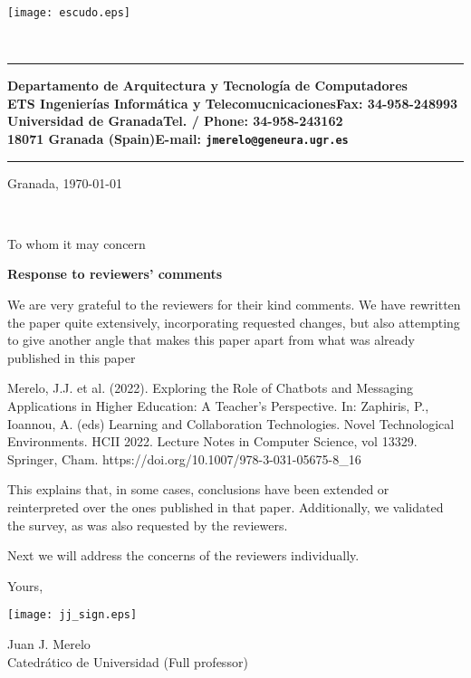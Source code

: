 \documentclass{letter}
\makeatletter
\def\email{\tt jmerelo@geneura.ugr.es}
\def\tel{34-958-243162}
\def\fax{34-958-248993}
\def\granada{18071 Granada (Spain)}
\def\ucm{Universidad de Granada}
\def\fac{ETS Ingenierías Informática y Telecomucnicaciones}
\def\dpto{Departamento de Arquitectura y Tecnolog\'ia de Computadores}
\def\cabecera{

\begin{minipage}{2.5cm}
\centerline{  \texttt{[image: escudo.eps]} }
\end{minipage}
\ \
\begin{minipage}{13cm}
 \rule{13cm}{0.6mm}
 \vspace*{0.3cm}
 {\small{\bf \dpto \hfill}} \\
 {\footnotesize{\bf \fac \hfill Fax: \fax}} \\
 {\footnotesize{\bf \ucm \hfill Tel. / Phone: \tel}} \\
 {\footnotesize{\bf \granada \hfill E-mail: \email}}\\
 \rule{13cm}{0.6mm}
\end{minipage}
}
\makeatother
\begin{document}
\cabecera

\vspace{0.5cm}

\hspace{7cm}

\hfill Granada, \today

\vspace{0.5cm}
\ \
{
\begin{minipage}[t]{9cm}
To whom it may concern
\end{minipage}
 }

\vspace{0.5cm}



{\bf Response to reviewers' comments}

We are very grateful to the reviewers for their kind comments. We have rewritten
the paper quite extensively, incorporating requested changes, but also
attempting to give another angle that makes this paper apart from what was
already published in this paper

Merelo, J.J. et al. (2022). Exploring the Role of Chatbots and Messaging
Applications in Higher Education: A Teacher’s Perspective. In: Zaphiris, P.,
Ioannou, A. (eds) Learning and Collaboration Technologies. Novel Technological
Environments. HCII 2022. Lecture Notes in Computer Science, vol 13329. Springer,
Cham. https://doi.org/10.1007/978-3-031-05675-8_16

This explains that, in some cases, conclusions have been extended or
reinterpreted over the ones published in that paper. Additionally, we validated
the survey, as was also requested by the reviewers.

Next we will address the concerns of the reviewers individually.


\hspace*{8cm} Yours,  \\

\centerline{\texttt{[image: jj\_sign.eps]}}

\hspace*{8cm} Juan J. Merelo\\
\hspace*{8cm} Catedrático de Universidad (Full professor)
\end{document}
